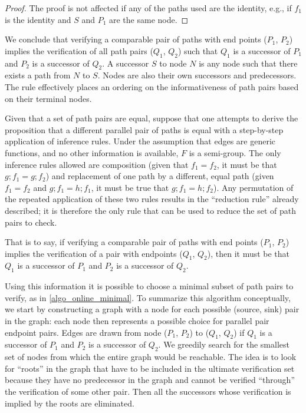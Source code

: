 \documentclass[sigplan,review,nonacm=true]{acmart}
\begin{document}
{\begin{proof}
The proof is not affected if any of the paths used are the identity, e.g., if $f_1$ is the identity and $S$ and $P_1$ are the same node.
\end{proof}

We conclude that verifying a comparable pair of paths with end points ($P_1$, $P_2$) implies the verification of all path pairs ($Q_1$, $Q_2$) such that $Q_1$ is a successor of $P_1$ and $P_2$ is a successor of $Q_2$. A successor $S$ to node $N$ is any node such that there exists a path from $N$ to $S$. Nodes are also their own successors and predecessors.
The rule effectively places an ordering on the informativeness of path pairs based on their terminal nodes.

 Given that a set of path pairs are equal, suppose that one attempts to derive the proposition that a different parallel pair of paths is equal with a step-by-step application of inference rules.
 Under the assumption that edges are generic functions, and no other information is available, $F$ is a semi-group.
 The only inference rules allowed are composition (given that $f_1=f_2$, it must be that $g ; f_1 = g ; f_2$) and replacement of one path by a different, equal path (given $f_1=f_2$ and $g ; f_1 = h ; f_1 $, it must be true that $g ; f_1 = h ; f_2$). Any permutation of the repeated application of these two rules results in the ``reduction rule'' already described; it is therefore the only rule that can be used to reduce the set of path pairs to check.

That is to say, if verifying a comparable pair of paths with end points ($P_1$, $P_2$) implies the verification of a pair with endpoints ($Q_1$, $Q_2$), then it must be that $Q_1$ is a successor of $P_1$ and $P_2$ is a successor of $Q_2$. %

Using this information it is possible to choose a minimal subset of path pairs to verify, as in \ref{algo_online_minimal}.
%
To summarize this algorithm conceptually, we start by constructing a graph with a node for each possible (source, sink) pair in the graph: each node then represents a possible choice for parallel pair endpoint pairs. Edges are drawn from node ($P_1$, $P_2$) to ($Q_1$, $Q_2$) if $Q_1$ is a successor of $P_1$ and $P_2$ is a successor of $Q_2$. We greedily search for the smallest set of nodes from which the entire graph would be reachable. The idea is to look for ``roots'' in the graph that have to be included in the ultimate verification set because they have no predecessor in the graph and cannot be verified ``through'' the verification of some other pair. Then all the successors whose verification is implied by the roots are eliminated.

}
\end{document}
